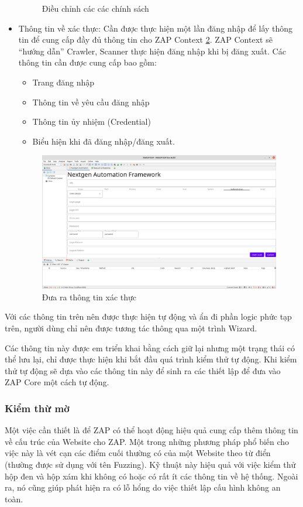 \documentclass[./../main.tex]{subfiles}
\begin{document}
\begin{itemize}
\begin{figure}[h!]
		      \caption{ Điều chỉnh các các chính sách }
		      \label{fig:policy}
	      \end{figure}
	\item Thông tin về xác thực: Cần được thực hiện một lần đăng nhập
	      để lấy thông tin để cung cấp đầy đủ thông tin cho ZAP Context \ref{fig:authen}.
	      ZAP Context sẽ “hướng dẫn” Crawler, Scanner thực hiện đăng nhập khi
	      bị đăng xuất. Các thông tin cần được cung cấp bao gồm:
	      \begin{itemize}
		      \item Trang đăng nhập
		      \item Thông tin về yêu cầu đăng nhập
		      \item Thông tin ủy nhiệm (Credential)
		      \item Biểu hiện khi đã đăng nhập/đăng xuất.
	      \end{itemize}
	      \begin{figure}[h!]
		      \includegraphics[width=\linewidth]{./images/authen.png}
		      \caption{ Đưa ra thông tin xác thực }
		      \label{fig:authen}
	      \end{figure}

\end{itemize}
Với các thông tin trên nên được thực hiện tự động và ẩn đi phần logic
phức tạp trên, người dùng chỉ nên được tương tác thông qua một trình
Wizard.

Các thông tin này được em triển khai bằng cách giữ lại nhưng một
trạng thái có thể lưu lại, chỉ được thực hiện khi bắt đầu quá trình
kiểm thử tự động. Khi kiểm thử tự động sẽ dựa vào các thông tin này
để sinh ra các thiết lập để đưa vào ZAP Core một cách tự động.

\subsubsection{Kiểm thừ mờ}
Một việc cần thiết là để ZAP có thể hoạt động hiệu quả cung cấp thêm
thông tin về cấu trúc của Website cho ZAP. Một trong những phương pháp
phổ biến cho việc này là vét cạn các điểm cuối thường có của một Website
theo từ điển (thường được sử dụng với tên Fuzzing). Kỹ thuật này hiệu
quả với việc kiểm thử hộp đen và hộp xám khi không có hoặc có rất ít
các thông tin về hệ thống. Ngoài ra, nó cũng giúp phát hiện ra có lỗ
hổng do việc thiết lập cấu hình không an toàn.
\end{document}
